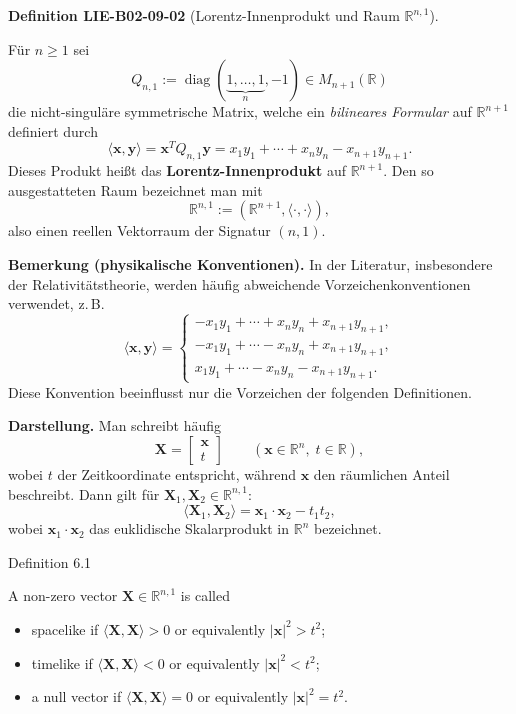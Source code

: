 \documentclass[10pt, letterpaper]{article}
\newcommand{\CustomHeading}[3]{%
  \par\medskip\noindent%
  \textbf{#1 #2} \textnormal{(#3)}.\enskip%
}
\newenvironment{DEF}[2]{\begin{unitbox}\CustomHeading{Definition}{#1}{#2}}{\end{unitbox}}
\begin{document}
\begin{DEF}{LIE-B02-09-02}{Lorentz-Innenprodukt und Raum $\mathbb{R}^{n,1}$}
Für \(n\ge1\) sei
\[
Q_{n,1} := \operatorname{diag}(\underbrace{1,\ldots,1}_{n},-1)
  \in M_{n+1}(\mathbb{R})
\]
die nicht-singuläre symmetrische Matrix, welche ein \emph{bilineares
Formular} auf \(\mathbb{R}^{n+1}\) definiert durch
\[
\langle \mathbf{x},\mathbf{y}\rangle
= \mathbf{x}^{T} Q_{n,1} \mathbf{y}
= x_1y_1+\cdots+x_ny_n - x_{n+1}y_{n+1}.
\]
Dieses Produkt heißt das \textbf{Lorentz-Innenprodukt} auf
\(\mathbb{R}^{n+1}\). Den so ausgestatteten Raum bezeichnet man mit
\[
\mathbb{R}^{n,1} := (\mathbb{R}^{n+1},\langle\cdot,\cdot\rangle),
\]
also einen reellen Vektorraum der Signatur \((n,1)\).

\textbf{Bemerkung (physikalische Konventionen).}
In der Literatur, insbesondere der Relativitätstheorie, werden häufig
abweichende Vorzeichenkonventionen verwendet, z.\,B.
\[
\langle\mathbf{x},\mathbf{y}\rangle =
\begin{cases}
 -x_1y_1+\cdots+x_ny_n+x_{n+1}y_{n+1},\\[1mm]
 -x_1y_1+\cdots-x_ny_n+x_{n+1}y_{n+1},\\[1mm]
  x_1y_1+\cdots-x_ny_n-x_{n+1}y_{n+1}.
\end{cases}
\]
Diese Konvention beeinflusst nur die Vorzeichen der folgenden Definitionen.

\textbf{Darstellung.}
Man schreibt häufig
\[
\mathbf{X}=
\begin{bmatrix}
\mathbf{x}\\ t
\end{bmatrix}
\qquad
(\mathbf{x}\in\mathbb{R}^n,\; t\in\mathbb{R}),
\]
wobei \(t\) der Zeitkoordinate entspricht, während \(\mathbf{x}\)
den räumlichen Anteil beschreibt. Dann gilt für
\(\mathbf{X}_1,\mathbf{X}_2\in\mathbb{R}^{n,1}\):
\[
\langle \mathbf{X}_1,\mathbf{X}_2\rangle
= \mathbf{x}_1\cdot \mathbf{x}_2 - t_1 t_2,
\]
wobei \(\mathbf{x}_1\cdot\mathbf{x}_2\) das euklidische Skalarprodukt in
\(\mathbb{R}^n\) bezeichnet.
\end{DEF}



Definition 6.1


A non-zero vector $\mathbf{X} \in \mathbb{R}^{n, 1}$ is called
\begin{itemize}
  \item spacelike if $\langle\mathbf{X}, \mathbf{X}\rangle>0$ or equivalently $|\mathbf{x}|^{2}>t^{2}$;
  \item timelike if $\langle\mathbf{X}, \mathbf{X}\rangle<0$ or equivalently $|\mathbf{x}|^{2}<t^{2}$;
  \item a null vector if $\langle\mathbf{X}, \mathbf{X}\rangle=0$ or equivalently $|\mathbf{x}|^{2}=t^{2}$.
\end{itemize}
\end{document}
